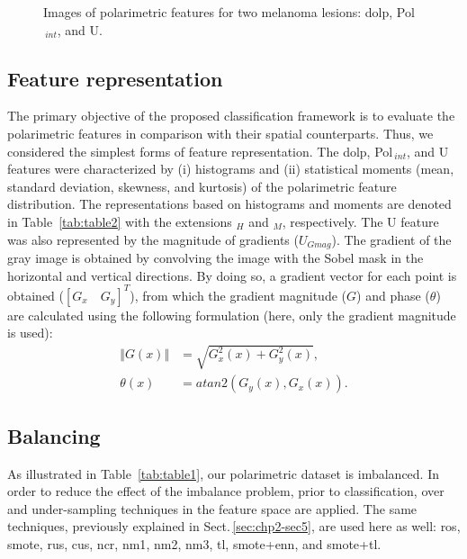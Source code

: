 \begin{figure}
\begin{center}
	\end{center}
	\caption[Images of polarimetric features.]{Images of polarimetric features for two melanoma lesions: \ac{dolp}, Pol$_{~int}$, and U.}
	\label{fig:PF-image}
\end{figure}



\subsection{Feature representation}
The primary objective of the proposed classification  framework is to evaluate the polarimetric features in comparison with their spatial counterparts.
Thus, we considered the simplest forms of feature representation.
The \ac{dolp}, Pol$_{~int}$, and U features were characterized by (i) histograms and (ii) statistical moments (mean, standard deviation, skewness, and kurtosis) of the polarimetric feature distribution.
The representations based on histograms and moments are denoted in Table~{\ref{tab:table2}} with the extensions $_H$ and $_M$, respectively.
The U feature was also represented by the magnitude of gradients ($U_{Gmag}$).
The gradient of the gray image is obtained by convolving the image with the Sobel mask in the horizontal and vertical directions. 
By doing so, a gradient vector for each point is obtained ($[G_{x} \quad G_{y}]^{T}$), from which the gradient magnitude ($G$) and phase ($\theta$) are calculated using the following formulation (here, only the gradient magnitude is used):
\begin{align}
	\Vert G(x) \Vert & = \sqrt{G_{x}^2(x) + G_{y}^{2}(x)}, \\
	\theta(x) & =  atan2(G_{y}(x), G_{x}(x)).
	\label{eq:MPgrad}
\end{align}

\subsection{Balancing}
As illustrated in Table~\ref{tab:table1}, our polarimetric dataset is imbalanced. 
In order to reduce the effect of the imbalance problem, prior to classification, over and under-sampling techniques in the feature space are applied.
The same techniques, previously explained in Sect.\,\ref{sec:chp2-sec5}, are used here as well: \ac{ros}, \ac{smote}, \ac{rus}, \ac{cus}, \ac{ncr}, \ac{nm1}, \ac{nm2}, \ac{nm3}, \ac{tl}, \ac{smote}+\ac{enn}, and \ac{smote}+\ac{tl}.

